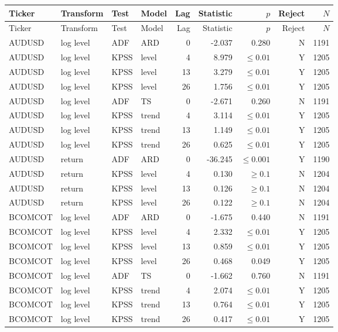 \par\medskip\noindent
{\footnotesize
\begin{longtable}{@{}llllrrrrr@{}}
\toprule
Ticker & Transform & Test & Model & Lag & Statistic & $p$ & Reject & $N$\\
\midrule
\endfirsthead
\toprule
Ticker & Transform & Test & Model & Lag & Statistic & $p$ & Reject & $N$\\
\midrule
\endhead
AUDUSD & log level & ADF & ARD & 0 & -2.037 & 0.280 & N & 1191\\
AUDUSD & log level & KPSS & level & 4 & 8.979 & $\leq 0.01$ & Y & 1205\\
AUDUSD & log level & KPSS & level & 13 & 3.279 & $\leq 0.01$ & Y & 1205\\
AUDUSD & log level & KPSS & level & 26 & 1.756 & $\leq 0.01$ & Y & 1205\\
AUDUSD & log level & ADF & TS & 0 & -2.671 & 0.260 & N & 1191\\
AUDUSD & log level & KPSS & trend & 4 & 3.114 & $\leq 0.01$ & Y & 1205\\
AUDUSD & log level & KPSS & trend & 13 & 1.149 & $\leq 0.01$ & Y & 1205\\
AUDUSD & log level & KPSS & trend & 26 & 0.625 & $\leq 0.01$ & Y & 1205\\
AUDUSD & return & ADF & ARD & 0 & -36.245 & $\leq 0.001$ & Y & 1190\\
AUDUSD & return & KPSS & level & 4 & 0.130 & $\geq 0.1$ & N & 1204\\
AUDUSD & return & KPSS & level & 13 & 0.126 & $\geq 0.1$ & N & 1204\\
AUDUSD & return & KPSS & level & 26 & 0.122 & $\geq 0.1$ & N & 1204\\
BCOMCOT & log level & ADF & ARD & 0 & -1.675 & 0.440 & N & 1191\\
BCOMCOT & log level & KPSS & level & 4 & 2.332 & $\leq 0.01$ & Y & 1205\\
BCOMCOT & log level & KPSS & level & 13 & 0.859 & $\leq 0.01$ & Y & 1205\\
BCOMCOT & log level & KPSS & level & 26 & 0.468 & 0.049 & Y & 1205\\
BCOMCOT & log level & ADF & TS & 0 & -1.662 & 0.760 & N & 1191\\
BCOMCOT & log level & KPSS & trend & 4 & 2.074 & $\leq 0.01$ & Y & 1205\\
BCOMCOT & log level & KPSS & trend & 13 & 0.764 & $\leq 0.01$ & Y & 1205\\
BCOMCOT & log level & KPSS & trend & 26 & 0.417 & $\leq 0.01$ & Y & 1205\\

\end{longtable}}
